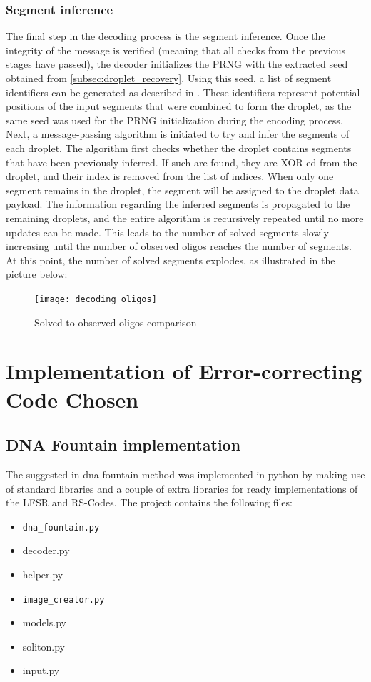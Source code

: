 \documentclass[12pt]%
{article}
\begin{document}
\subsubsection{Segment inference}

The final step in the decoding process is the segment inference. Once the integrity of the message is verified (meaning that all checks from the previous stages have passed), the decoder initializes the PRNG with the extracted seed obtained from \ref{subsec:droplet_recovery}. Using this seed, a list of segment identifiers can be generated as described in \cite{erlich2017dnasupplementary}. These identifiers represent potential positions of the input segments that were combined to form the droplet, as the same seed was used for the PRNG initialization during the encoding process. \\
Next, a message-passing algorithm is initiated to try and infer the segments of each droplet. The algorithm first checks whether the droplet contains segments that have been previously inferred. If such are found, they are XOR-ed from the droplet, and their index is removed from the list of indices. When only one segment remains in the droplet, the segment will be assigned to the droplet data payload. The information regarding the inferred segments is propagated to the remaining droplets, and the entire algorithm is recursively repeated until no more updates can be made. This leads to the number of solved segments slowly increasing until the number of observed oligos reaches the number of segments. At this point, the number of solved segments explodes, as illustrated in the picture below:

 \begin{figure}[h]
    \centering
    \texttt{[image: decoding\_oligos]}
    \caption{Solved to observed oligos comparison \cite{erlich2017dnasupplementary}}
\end{figure}


\section{Implementation of  Error-correcting Code Chosen}

\subsection{DNA Fountain implementation}\label{subsec:implementation}

The suggested in \cite{erlich2017dna} dna fountain method was implemented in python by making use of standard libraries and a couple of extra libraries for ready implementations of the LFSR and RS-Codes. The project contains the following files:
\begin{itemize}
\item \texttt{dna\_fountain.py}
\item decoder.py
\item helper.py
\item \texttt{image\_creator.py}
\item models.py
\item soliton.py
\item input.py
\end{itemize}
\end{document}
